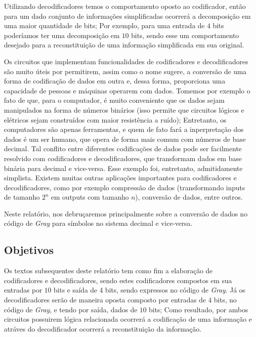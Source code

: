 \documentclass[12pt]{article}
\begin{document}
Utilizando decodificadores temos o comportamento oposto ao codificador, então
para um dado conjunto de informações simplificadas ocorrerá a decomposição em
uma maior quantidade de bits; Por exemplo, para uma entrada de $4$ bits
poderíamos ter uma decomposição em $10$ bits, sendo esse um comportamento
desejado para a reconstituição de uma informação simplificada em sua original.

Os circuitos que implementam funcionalidades de codificadores e decodificadores
são muito úteis por permitirem, assim como o nome sugere, a conversão de uma
forma de codificação de dados em outra e, dessa forma, proporciona uma
capacidade de pessoas e máquinas operarem com dados. Tomemos por exemplo o fato
de que, para o computador, é muito conveniente que os dados sejam manipulados na
forma de números binários (isso permite que circuitos lógicos e elétricos sejam
construídos com maior resistência a ruído); Entretanto, os computadores são
apenas ferramentas, e quem de fato fará a inperpretação dos dados é um ser
humano, que opera de forma mais comum com números de base decimal. Tal conflito
entre diferentes codificações de dados pode ser facilmente resolvido com
codificadores e decodificadores, que transformam dados em base binária para
decimal e vice-versa. Esse exemplo foi, entretanto, admitidamente simplista.
Existem muitas outras aplicações importantes para codificadores e
decodificadores, como por exemplo compressão de dados (transformando inputs de
tamanho $2^{n}$ em outputs com tamanho $n$), conversão de dados, entre outros.

Neste relatório, nos debruçaremos principalmente sobre a conversão de dados no
código de \emph{Gray} para símbolos no sistema decimal e vice-versa.

\subsection{Objetivos}
\label{sec:Objetivos}

Os textos subsequentes deste relatório tem como fim a elaboração de
codificadores e decodificadores, sendo estes codificadores compostos em sua
entradas por $10$ bits e saída de $4$ bits, sendo expressos no código de
\emph{Gray}. Já os decodificadores serão de maneira oposta composto por entradas
de $4$ bits, no código de \emph{Gray}, e tendo por saída, dados de $10$ bits;
Como resultado, por ambos circuitos possuirem lógica relacionada ocorrerá a
codificação de uma informação e atráves do decodificador ocorrerá a
reconstituição da informação.
\end{document}
